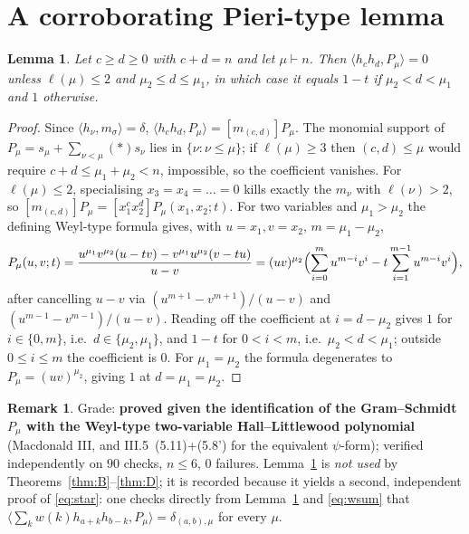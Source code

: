\documentclass[11pt]{article}
\theoremstyle{plain}
\newtheorem{lemma}[theorem]{Lemma}
\theoremstyle{definition}
\newtheorem{remark}[theorem]{Remark}
\begin{document}
\section{A corroborating Pieri-type lemma}

\begin{lemma}\label{lem:psi}
Let $c\ge d\ge 0$ with $c+d=n$ and let $\mu\vdash n$. Then $\langle h_ch_d,P_\mu\rangle=0$ unless
$\ell(\mu)\le 2$ and $\mu_2\le d\le\mu_1$, in which case it equals $1-t$ if
$\mu_2<d<\mu_1$ and $1$ otherwise.
\end{lemma}

\begin{proof}
Since $\langle h_\nu,m_\sigma\rangle=\delta$, $\langle h_ch_d,P_\mu\rangle=[m_{(c,d)}]P_\mu$. The
monomial support of $P_\mu=s_\mu+\sum_{\nu<\mu}(\ast)s_\nu$ lies in $\{\nu:\nu\le\mu\}$; if
$\ell(\mu)\ge 3$ then $(c,d)\le\mu$ would require $c+d\le\mu_1+\mu_2<n$, impossible, so the
coefficient vanishes. For $\ell(\mu)\le 2$, specialising $x_3=x_4=\dots=0$ kills exactly the
$m_\nu$ with $\ell(\nu)>2$, so $[m_{(c,d)}]P_\mu=[x_1^cx_2^d]P_\mu(x_1,x_2;t)$. For two variables
and $\mu_1>\mu_2$ the defining Weyl-type formula gives, with $u=x_1,v=x_2$, $m=\mu_1-\mu_2$,
\[
  P_\mu(u,v;t)=\frac{u^{\mu_1}v^{\mu_2}(u-tv)-v^{\mu_1}u^{\mu_2}(v-tu)}{u-v}
  =(uv)^{\mu_2}\Bigl(\sum_{i=0}^{m}u^{m-i}v^{i}-t\sum_{i=1}^{m-1}u^{m-i}v^{i}\Bigr),
\]
after cancelling $u-v$ via $(u^{m+1}-v^{m+1})/(u-v)$ and $(u^{m-1}-v^{m-1})/(u-v)$. Reading off
the coefficient at $i=d-\mu_2$ gives $1$ for $i\in\{0,m\}$, i.e.\ $d\in\{\mu_2,\mu_1\}$, and
$1-t$ for $0<i<m$, i.e.\ $\mu_2<d<\mu_1$; outside $0\le i\le m$ the coefficient is $0$. For
$\mu_1=\mu_2$ the formula degenerates to $P_\mu=(uv)^{\mu_2}$, giving $1$ at $d=\mu_1=\mu_2$.
\end{proof}

\begin{remark}
Grade: \textbf{proved given the identification of the Gram--Schmidt $P_\mu$ with the
Weyl-type two-variable Hall--Littlewood polynomial} (Macdonald III, and III.5~(5.11)+(5.8') for
the equivalent $\psi$-form); verified independently on $90$ checks, $n\le 6$, $0$ failures.
Lemma~\ref{lem:psi} is \emph{not used} by Theorems~\ref{thm:B}--\ref{thm:D}; it is recorded
because it yields a second, independent proof of \eqref{eq:star}: one checks directly from
Lemma~\ref{lem:psi} and \eqref{eq:wsum} that
$\langle \sum_k w(k)h_{a+k}h_{b-k},P_\mu\rangle=\delta_{(a,b),\mu}$ for every $\mu$.
\end{remark}
\end{document}
